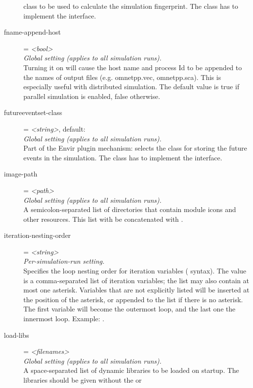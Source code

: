 \begin{description}
    class to be used to calculate the simulation fingerprint. The class has to
    implement the  interface.
\item[fname-append-host] = \textit{<bool>}\\
    \textit{Global setting (applies to all simulation runs).}\\
    Turning it on will cause the host name and process Id to be appended to the
    names of output files (e.g. omnetpp.vec, omnetpp.sca). This is especially
    useful with distributed simulation. The default value is true if parallel
    simulation is enabled, false otherwise.
\item[futureeventset-class] = \textit{<string>}, default: \\
    \textit{Global setting (applies to all simulation runs).}\\
    Part of the Envir plugin mechanism: selects the class for storing the
    future events in the simulation. The class has to implement the
     interface.
\item[image-path] = \textit{<path>}\\
    \textit{Global setting (applies to all simulation runs).}\\
    A semicolon-separated list of directories that contain module icons and
    other resources. This list with be concatenated with
    .
\item[iteration-nesting-order] = \textit{<string>}\\
    \textit{Per-simulation-run setting.}\\
    Specifies the loop nesting order for iteration variables
    (\ttt{\$\{{\allowbreak}\}{\allowbreak}} syntax). The value is a
    comma-separated list of iteration variables; the list may also contain at
    most one asterisk. Variables that are not explicitly listed will be
    inserted at the position of the asterisk, or appended to the list if there
    is no asterisk. The first variable will become the outermost loop, and the
    last one the innermost loop. Example:
    .
\item[load-libs] = \textit{<filenames>}\\
    \textit{Global setting (applies to all simulation runs).}\\
    A space-separated list of dynamic libraries to be loaded on startup. The
    libraries should be given without the  or

\end{description}
